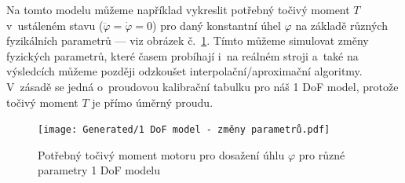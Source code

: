 Na tomto modelu můžeme například vykreslit potřebný točivý moment $T$ v~ustáleném stavu ($\ddot{\varphi} = \dot{\varphi} = 0$) pro daný konstantní úhel $\varphi$ na základě různých fyzikálních para\-metrů --- viz obrázek č.~\ref{fig:1 DoF pro různé parametry}. Tímto můžeme simulovat změny fyzických parametrů, které časem probíhají i~na reálném stroji a~také na výsledcích můžeme později odzkoušet interpolační/aproximační algoritmy. V~zásadě se jedná o~proudovou kalibrační tabulku pro náš 1 DoF model, protože točivý moment $T$ je přímo úměrný proudu.
\begin{figure}[H]
    \centering
    \texttt{[image: Generated/1 DoF model - změny parametrů.pdf]}
    \caption{Potřebný točivý moment motoru pro dosažení úhlu $\varphi$ pro různé parametry 1 DoF modelu}
    \label{fig:1 DoF pro různé parametry}
\end{figure}